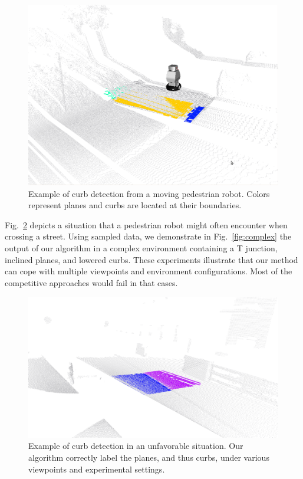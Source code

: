 \begin{figure}[t]
\centering
\includegraphics[width=\columnwidth]{fig/europa.eps}
\caption{Example of curb detection from a moving pedestrian robot. Colors
represent planes and curbs are located at their boundaries.}
\label{fig:europa}
\end{figure}

Fig.~\ref{fig:special} depicts a situation that a pedestrian robot might often
encounter when crossing a street. Using sampled data, we demonstrate in
Fig.~\ref{fig:complex} the output of our algorithm in a complex environment
containing a T junction, inclined planes, and lowered curbs. These experiments
illustrate that our method can cope with multiple viewpoints and environment
configurations. Most of the competitive approaches would fail in that cases.

\begin{figure}[t]
\centering
\includegraphics[width=\columnwidth]{fig/special.eps}
\caption{Example of curb detection in an unfavorable situation. Our algorithm
correctly label the planes, and thus curbs, under various viewpoints and
experimental settings.}
\label{fig:special}
\end{figure}

